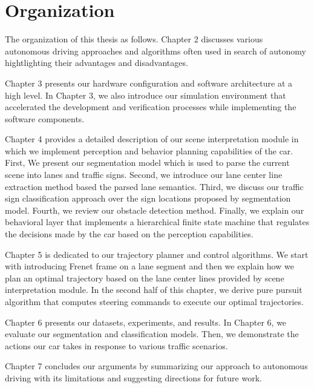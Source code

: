 \section{Organization}

The organization of this thesis as follows. Chapter 2 discusses various
autonomous driving approaches and algorithms often used in search of autonomy
hightlighting their advantages and disadvantages.

Chapter 3 presents our hardware configuration and software architecture at a
high level. In Chapter 3, we also introduce our simulation environment that
accelerated the development and verification processes while implementing the
software components.

Chapter 4 provides a detailed description of our scene interpretation module in
which we implement perception and behavior planning capabilities of the car.
First, We present our segmentation model which is used to parse the current
scene into lanes and traffic signs. Second, we introduce our lane center line
extraction method based the parsed lane semantics. Third, we discuss our
traffic sign classification approach over the sign locations proposed by
segmentation model. Fourth, we review our obstacle detection method. Finally,
we explain our behavioral layer that implements a hierarchical finite state
machine that regulates the decisions made by the car based on the perception
capabilities.

Chapter 5 is dedicated to our trajectory planner and control algorithms. We
start with introducing Frenet frame on a lane segment and then we explain how
we plan an optimal trajectory based on the lane center lines provided by scene
interpretation module. In the second half of this chapter, we derive pure
pursuit algorithm that computes steering commands to execute our optimal
trajectories.

Chapter 6 presents our datasets, experiments, and results. In Chapter 6, we
evaluate our segmentation and classification models. Then, we demonstrate the
actions our car takes in response to various traffic scenarios.

Chapter 7 concludes our arguments by summarizing our approach to autonomous
driving with its limitations and suggesting directions for future work.
